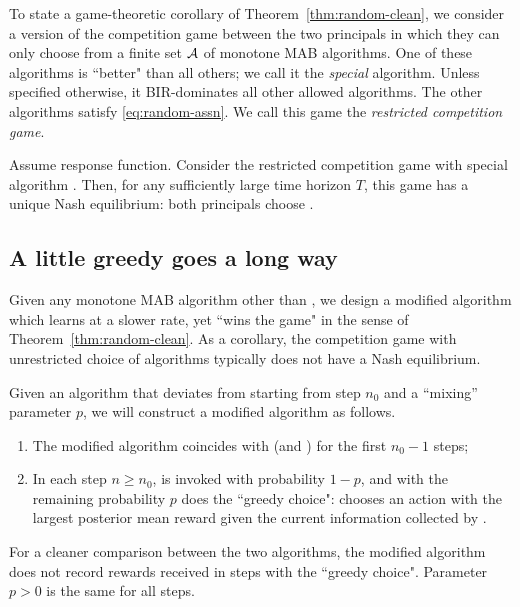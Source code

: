 


To state a game-theoretic corollary of Theorem~\ref{thm:random-clean}, we consider a version of the competition game between the two principals in which they can only choose from a finite set $\mathcal{A}$ of monotone MAB algorithms. One of these algorithms is ``better" than all others; we call it the \emph{special} algorithm. Unless specified otherwise, it BIR-dominates all other allowed algorithms. The other algorithms satisfy \eqref{eq:random-assn}. We call this game the \emph{restricted competition game}.

\begin{corollary}\label{cor:random}
Assume \HardMaxRandom response function. Consider the restricted competition game with special algorithm \alg. Then, for any sufficiently large time horizon $T$, this game has a unique Nash equilibrium: both principals choose \alg.
\end{corollary}


\subsection{A little greedy goes a long way}
\label{sec:random-greedy}

Given any monotone MAB algorithm other than \DynGreedy, we design a modified algorithm which learns at a slower rate, yet ``wins the game" in the sense of Theorem~\ref{thm:random-clean}. As a corollary, the competition game with unrestricted choice of algorithms typically does not have a Nash equilibrium.

Given an algorithm \alg[1] that deviates from \DynGreedy starting from
step $n_0$ and a ``mixing'' parameter $p$, we will construct a
modified algorithm as follows.
\begin{enumerate}
\item The modified algorithm coincides with \alg[1] (and \DynGreedy)
for the first $n_0-1$ steps;
\item In each step $n\geq n_0$, \alg[1] is invoked with probability
  $1-p$, and with the remaining probability $p$ does the ``greedy
  choice": chooses an action with the largest posterior mean reward
  given the current information collected by \alg[1].
\end{enumerate}
For a cleaner comparison between the two algorithms, the modified algorithm does not record rewards received in steps with the ``greedy choice". Parameter $p>0$ is the same for all steps.

